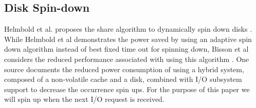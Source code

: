 
\subsection{Disk Spin-down}

Helmbold et al. proposes the share algorithm to dynamically spin down disks
\cite{disk-spindown}. While Helmbold et al demonstrates the power saved by using
an adaptive spin down algorithm instead of best fixed time out for spinning
down, Bisson et al considers the reduced performance associated with using this
algorithm \cite{spindown-algorithms}. One source documents the reduced power
consumption of using a hybrid system, composed of a non-volatile cache and a
disk, combined with I/O subsystem support to decrease the occurrence spin
ups. For the purpose of this paper we will spin up when the next I/O request is
received.
